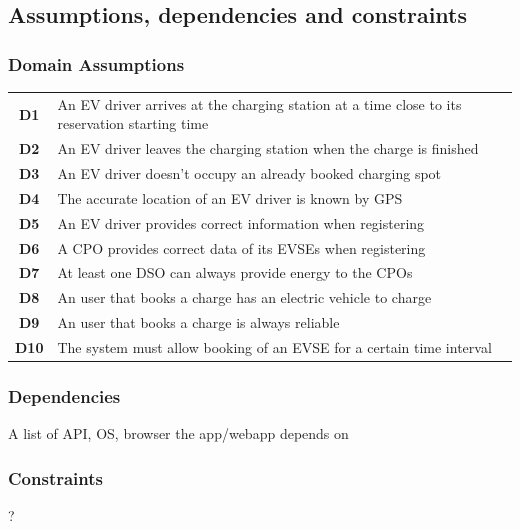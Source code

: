 \subsection{Assumptions, dependencies and constraints}
\subsubsection*{Domain Assumptions}
\begin{table}[H]
      \begin{tabularx}{\textwidth}{cX}
            \toprule
            \textbf{D1}  & An EV driver arrives at the charging station at a time close to its reservation starting time \\
            \textbf{D2}  & An EV driver leaves the charging station when the charge is finished                          \\
            \textbf{D3}  & An EV driver doesn't occupy an already booked charging spot                                   \\
            \textbf{D4}  & The accurate location of an EV driver is known by GPS                                         \\
            \textbf{D5}  & An EV driver provides correct information when registering                                    \\
            \textbf{D6}  & A CPO provides correct data of its EVSEs when registering                                     \\
            \textbf{D7}  & At least one DSO can always provide energy to the CPOs                                        \\
            \textbf{D8}  & An user that books a charge has an electric vehicle to charge                                 \\
            \textbf{D9}  & An user that books a charge is always reliable                                                \\
            \textbf{D10} & The system must allow booking of an EVSE for a certain time interval                          \\ \bottomrule
      \end{tabularx}
\end{table}
\subsubsection*{Dependencies}
A list of API, OS, browser the app/webapp depends on
\subsubsection*{Constraints}
?
